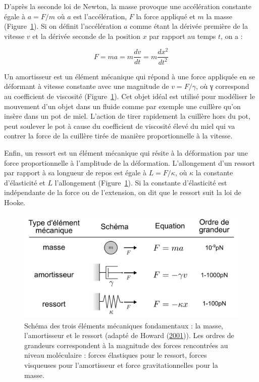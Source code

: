 \documentclass[12pt,a4paper,twoside,openright]{book}
\begin{document}
D'après la seconde loi de Newton, la masse provoque une accélération
constante égale à \(a = F/m\) où \(a\) est l'accélération, \(F\) la
force appliqué et \(m\) la masse (Figure~\ref{fig:force_types}). Si on
définit l'accélération \(a\) comme étant la dérivée première de la
vitesse \(v\) et la dérivée seconde de la position \(x\) par rapport au
temps \(t\), on a :

\[
F = ma = m\frac{dv}{dt} = m\frac{dx^2}{dt^2}
\]

Un amortisseur est un élément mécanique qui répond à une force appliquée
en se déformant à vitesse constante avec une magnitude de
\(v = F/\gamma\), où γ correspond au coefficient de viscosité
(Figure~\ref{fig:force_types}). Cet objet idéal est utilisé pour
modéliser le mouvement d'un objet dans un fluide comme par exemple une
cuillère qu'on insère dans un pot de miel. L'action de tirer rapidement
la cuillère hors du pot, peut soulever le pot à cause du coefficient de
viscosité élevé du miel qui va contrer la force de la cuillère tirée de
manière proportionnelle à la vitesse.

Enfin, un ressort est un élément mécanique qui résite à la déformation
par une force proportionnelle à l'amplitude de la déformation.
L'allongement d'un ressort par rapport à sa longueur de repos est égale
à \(L = F/\kappa\), où \(\kappa\) la constante d'élasticité et \(L\)
l'allongement (Figure~\ref{fig:force_types}). Si la constante
d'élasticité est indépendante de la force ou de l'extension, on dit que
le ressort suit la loi de Hooke.

\begin{figure}[htbp]
\centering
\includegraphics{figures/intro/force_types.png}
\caption[Schéma des trois éléments mécaniques fondamentaux]{\label{fig:force_types}Schéma
des trois éléments mécaniques fondamentaux : la masse, l'amortisseur et
le ressort (adapté de Howard
(\protect\hyperlink{ref-Howard2001}{2001})). Les ordres de grandeurs
correspondent à la magnitude des forces rencontrées au niveau
moléculaire : forces élastiques pour le ressort, forces visqueuses pour
l'amortisseur et force gravitationnelles pour la masse.}
\end{figure}
\end{document}
